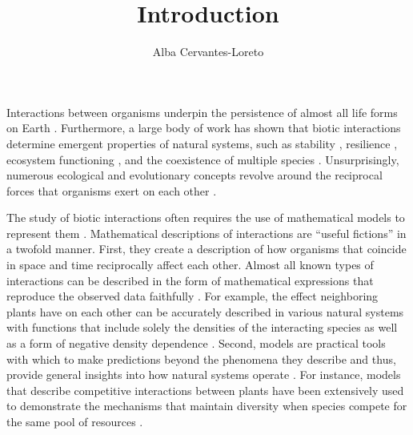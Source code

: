 \documentclass[12pt]{article}
\title{Introduction}
\author[1]{Alba Cervantes-Loreto}
\date{}
\begin{document}
\linenumbers
\baselineskip30pt
\maketitle


Interactions between organisms underpin the persistence of almost all life forms on Earth \citep{lawton1999there}. Furthermore, a large body of work has shown that biotic interactions determine emergent properties of natural systems, such as stability \citep{may1972will, wootton2016many,song2018will}, resilience \citep{capdevila2021reconciling}, ecosystem functioning \citep{turnbull2013coexistence,godoy2020excess}, and the coexistence of multiple species \citep{chesson2000mechanisms,saavedra2017structural}. Unsurprisingly, numerous ecological and evolutionary concepts revolve around the reciprocal forces that organisms exert on each other \citep{gause_experimental_1934,macarthur1967limiting,thompson1999evolution, hillerislambers2012rethinking, chase2009ecological}.

The study of biotic interactions often requires the use of mathematical models to represent them \citep{maynard1978models}. Mathematical descriptions of interactions are ``useful fictions'' \citep{box2011statistical} in a twofold manner. First, they create a description of how organisms that coincide in space and time reciprocally affect each other. Almost all known types of interactions can be described in the form of mathematical expressions that reproduce the observed data faithfully \citep{volterra1926fluctuations,holling1959some,holt1977predation,adler2018competition,wood1999super,holland2002population,vazquez2005interaction,stouffer2021hidden} . For example, the effect neighboring plants have on each other can be accurately described in various natural systems with functions that include solely the densities of the interacting species as well as a form of negative density dependence \citep{adler2018competition,hart2018quantify}. Second, models are practical tools with which to make predictions beyond the phenomena they describe and thus, provide general insights into how natural systems operate \citep{evans2012predictive,stouffer2019all} . For instance, models that describe competitive interactions between plants have been extensively used to demonstrate the mechanisms that maintain diversity when species compete for the same pool of resources \citep{levine2009importance,godoy_phylogenetic_2014, godoy_phenology_2014, stouffer2018cyclic,bimler_accurate_2018}.
\end{document}
